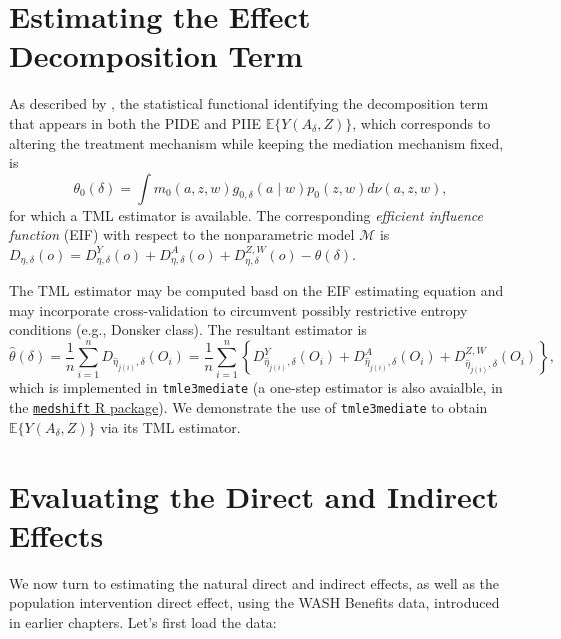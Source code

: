 \documentclass[12pt, krantz2,]{krantz}
\newcommand{\passthrough}[1]{#1}
\theoremstyle{definition}
\theoremstyle{definition}
\theoremstyle{definition}
\newcommand{\1}{\mathbbm{1}}
\begin{document}
\hypertarget{estimating-the-effect-decomposition-term}{%
\section{Estimating the Effect Decomposition Term}\label{estimating-the-effect-decomposition-term}}

As described by \citet{diaz2020causal}, the statistical functional identifying the
decomposition term that appears in both the PIDE and PIIE
\(\mathbb{E}\{Y(A_{\delta}, Z)\}\), which corresponds to altering the treatment
mechanism while keeping the mediation mechanism fixed, is
\begin{equation*}
  \theta_0(\delta) = \int m_0(a, z, w) g_{0,\delta}(a \mid w) p_0(z, w)
    d\nu(a, z, w),
\end{equation*}
for which a TML estimator is available. The corresponding \emph{efficient influence
function} (EIF) with respect to the nonparametric model \(\mathcal{M}\) is
\(D_{\eta,\delta}(o) = D^Y_{\eta,\delta}(o) + D^A_{\eta,\delta}(o) + D^{Z,W}_{\eta,\delta}(o) - \theta(\delta)\).

The TML estimator may be computed basd on the EIF estimating equation and may
incorporate cross-validation \citep{zheng2011cross, chernozhukov2018double} to
circumvent possibly restrictive entropy conditions (e.g., Donsker class). The
resultant estimator is
\begin{equation*}
  \hat{\theta}(\delta) = \frac{1}{n} \sum_{i = 1}^n D_{\hat{\eta}_{j(i)},
  \delta}(O_i) = \frac{1}{n} \sum_{i = 1}^n \left\{ D^Y_{\hat{\eta}_{j(i)},
  \delta}(O_i) + D^A_{\hat{\eta}_{j(i)}, \delta}(O_i) +
  D^{Z,W}_{\hat{\eta}_{j(i)}, \delta}(O_i) \right\},
\end{equation*}
which is implemented in \passthrough{\lstinline!tmle3mediate!} (a one-step estimator is also avaialble,
in the \href{https://github.com/nhejazi/medshift}{\passthrough{\lstinline!medshift!} R package}). We
demonstrate the use of \passthrough{\lstinline!tmle3mediate!} to obtain \(\mathbb{E}\{Y(A_{\delta}, Z)\}\)
via its TML estimator.

\hypertarget{evaluating-the-direct-and-indirect-effects}{%
\section{Evaluating the Direct and Indirect Effects}\label{evaluating-the-direct-and-indirect-effects}}

We now turn to estimating the natural direct and indirect effects, as well as
the population intervention direct effect, using the WASH Benefits data,
introduced in earlier chapters. Let's first load the data:
\end{document}
